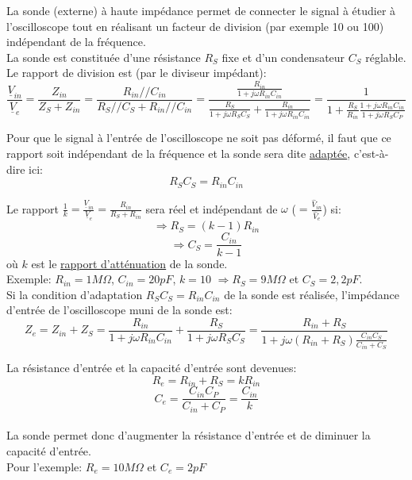 {%
La sonde (externe) à haute impédance permet de connecter le signal à étudier à l’oscilloscope tout en réalisant un facteur de division (par exemple 10 ou 100) indépendant de la fréquence.\\
La sonde est constituée d’une résistance $R_S$ fixe et d’un condensateur $C_S$ réglable.\\

Le rapport de division est (par le diviseur impédant):\\
$$\frac{\underline{V}_{in}}{\underline{V}_e}=\frac{Z_{in}}{Z_S+Z_{in}}=\frac{R_{in}//C_{in}}{R_{S}//C_{S}+R_{in}//C_{in}}=\frac{\frac{R_{in}}{1+j\omega R_{in}C_{in}}}{\frac{R_{S}}{1+j\omega R_{S}C_{S}}+\frac{R_{in}}{1+j\omega R_{in}C_{in}}}=\frac{1}{1+\frac{R_S}{R_{in}}\frac{1+j\omega R_{in}C_{in}}{1+j\omega R_{S}C_{P}}}$$

Pour que le signal à l'entrée de l'oscilloscope ne soit pas déformé, il faut que ce rapport soit indépendant de la fréquence et la sonde sera dite \underline{adaptée}, c'est-à-dire ici:\\
$$R_SC_S=R_{in}C_{in}$$

Le rapport $\frac{1}{k}=\frac{\underline{V}_{in}}{\underline{V}_e}=\frac{R_{in}}{R_S+R_{in}}$ sera réel et indépendant de $\omega$ ($=\frac{\widehat{V}_{in}}{\widehat{V}_e}$) si:\\
$$\Rightarrow R_S=(k-1)R_{in}$$
$$\Rightarrow C_S=\frac{C_{in}}{k-1}$$
où $k$ est le \underline{rapport d'atténuation} de la sonde.\\

Exemple: $R_{in}=1M\Omega$, $C_{in}=20pF$, $k=10$ $\Rightarrow R_S=9M\Omega$ et $C_S=2,2pF$.\\

Si la condition d’adaptation $R_SC_S=R_{in}C_{in}$ de la sonde est réalisée, l’impédance d’entrée de l’oscilloscope muni de la sonde est:\\
$$Z_e=Z_{in}+Z_S=\frac{R_{in}}{1+j\omega R_{in}C_{in}}+\frac{R_{S}}{1+j\omega R_{S}C_{S}}=\frac{R_{in}+R_S}{1+j\omega (R_{in}+R_S) \frac{C_{in}C_S}{C_{in}+C_S}}$$

La résistance d'entrée et la capacité d'entrée sont devenues:\\
$$R_e=R_{in}+R_S=kR_{in}$$
$$C_e=\frac{C_{in}C_P}{C_{in}+C_P}=\frac{C_{in}}{k}$$\\

La sonde permet donc d'augmenter la résistance d'entrée et de diminuer la capacité d'entrée.\\

Pour l'exemple: $R_e=10M\Omega$ et $C_e=2pF$
}

